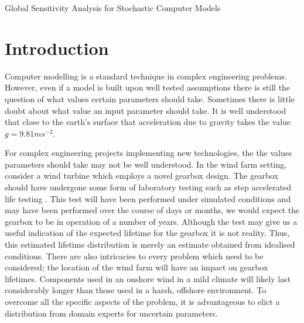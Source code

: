 \begin{chapter}{Global Sensitivity Analysis for Stochastic Computer Models}
\section{Introduction}
Computer modelling is a standard technique in complex engineering problems. However, even if a model is built upon well tested assumptions there is still the question of what values certain parameters should take. Sometimes there is little doubt about what value an input parameter should take. It is well understood that close to the earth's surface that acceleration due to gravity takes the value $g = 9.81ms^{-2}$.

For complex engineering projects implementing new technologies, the the values parameters should take may not be well understood. In the wind farm setting, consider a wind turbine which employs a novel gearbox design. The gearbox should have undergone some form of laboratory testing such as step accelerated life testing \citep{Nelson1980}. This test will have been performed under simulated conditions and may have been performed over the course of days or months, we would expect the gearbox to be in operation of a number of years. Although the test may give us a useful indication of the expected lifetime for the gearbox it is not reality\georgebox. Thus, this estimated lifetime distribution is merely an estimate obtained from idealised conditions. There are also intricacies to every problem which need to be considered; the location of the wind farm will have an impact on gearbox lifetimes. Components used in an onshore wind in a mild climate will likely last considerably longer than those used in a harsh, offshore environment. To overcome all the specific aspects of the problem, it is advantageous to elict a distribution from domain experts for uncertain parameters.


\end{chapter}
